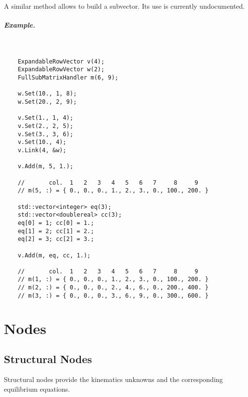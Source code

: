 \documentclass[10pt,dvips,fleqn,subeqn]{report}
\begin{document}
A similar method allows to build a subvector.
Its use is currently undocumented.

\paragraph{Example.} \
\begin{verbatim}
    ExpandableRowVector v(4);
    ExpandableRowVector w(2);
    FullSubMatrixHandler m(6, 9);

    w.Set(10., 1, 8);
    w.Set(20., 2, 9);

    v.Set(1., 1, 4);
    v.Set(2., 2, 5);
    v.Set(3., 3, 6);
    v.Set(10., 4);
    v.Link(4, &w);

    v.Add(m, 5, 1.);

    //       col.  1   2   3   4   5   6   7     8     9
    // m(5, :) = { 0., 0., 0., 1., 2., 3., 0., 100., 200. }

    std::vector<integer> eq(3);
    std::vector<doublereal> cc(3);
    eq[0] = 1; cc[0] = 1.;
    eq[1] = 2; cc[1] = 2.;
    eq[2] = 3; cc[2] = 3.;

    v.Add(m, eq, cc, 1.);

    //       col.  1   2   3   4   5   6   7     8     9
    // m(1, :) = { 0., 0., 0., 1., 2., 3., 0., 100., 200. }
    // m(2, :) = { 0., 0., 0., 2., 4., 6., 0., 200., 400. }
    // m(3, :) = { 0., 0., 0., 3., 6., 9., 0., 300., 600. }
\end{verbatim}








\chapter{Nodes}
\label{sec:nodes}

\section{Structural Nodes}
\label{sec:nodes:structural nodes}
Structural nodes provide the kinematics unknowns
and the corresponding equilibrium equations.
\end{document}
